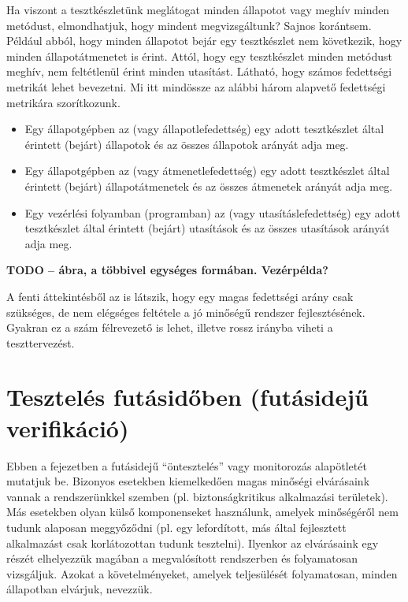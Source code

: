 Ha viszont a tesztkészletünk meglátogat minden állapotot vagy meghív minden metódust, elmondhatjuk, hogy mindent megvizsgáltunk? Sajnos korántsem. Például abból, hogy minden állapotot bejár egy tesztkészlet nem következik, hogy minden állapotátmenetet is érint. Attól, hogy egy tesztkészlet minden metódust meghív, nem feltétlenül érint minden utasítást. Látható, hogy számos fedettségi metrikát lehet bevezetni. Mi itt mindössze az alábbi három alapvető fedettségi metrikára szorítkozunk.
\begin{itemize}
	\item Egy állapotgépben az  (vagy állapotlefedettség) egy adott tesztkészlet által érintett (bejárt) állapotok és az összes állapotok arányát adja meg.
	\item Egy állapotgépben az  (vagy átmenetlefedettség) egy adott tesztkészlet által érintett (bejárt) állapotátmenetek és az összes átmenetek arányát adja meg.
	\item Egy vezérlési folyamban (programban) az  (vagy utasításlefedettség) egy adott tesztkészlet által érintett (bejárt) utasítások és az összes utasítások arányát adja meg.	
\end{itemize}

\begin{pelda}
\textbf{TODO -- ábra, a többivel egységes formában. Vezérpélda?}
\end{pelda}

A fenti áttekintésből az is látszik, hogy egy magas fedettségi arány csak szükséges, de nem elégséges feltétele a jó minőségű rendszer fejlesztésének. Gyakran ez a szám félrevezető is lehet, illetve rossz irányba viheti a teszttervezést.


\section{Tesztelés futásidőben (futásidejű verifikáció)}\label{sec:futasideju-verifikacio}
Ebben a fejezetben a futásidejű ``öntesztelés'' vagy monitorozás alapötletét mutatjuk be. Bizonyos esetekben kiemelkedően magas minőségi elvárásaink vannak a rendszerünkkel szemben (pl. biztonságkritikus alkalmazási területek). Más esetekben olyan külső komponenseket használunk, amelyek minőségéről nem tudunk alaposan meggyőződni (pl. egy lefordított, más által fejlesztett alkalmazást csak korlátozottan tudunk tesztelni). Ilyenkor az elvárásaink egy részét elhelyezzük magában a megvalósított rendszerben és folyamatosan vizsgáljuk. Azokat a követelményeket, amelyek teljesülését folyamatosan, minden állapotban elvárjuk,  nevezzük.

